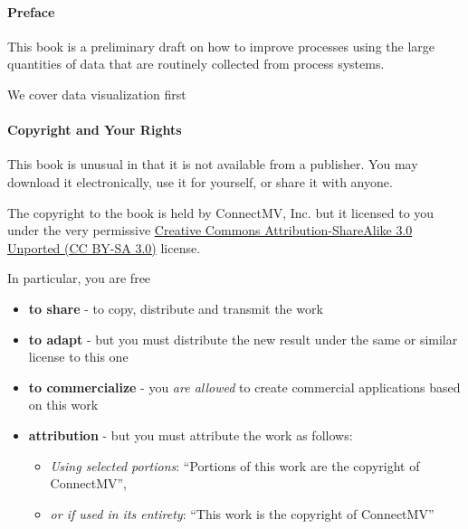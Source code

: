 \paragraph{Preface}





This book is a preliminary draft on how to improve processes using the large quantities of data that are routinely collected from process systems.

We cover data visualization first

\vskip24pt

\paragraph{Copyright and Your Rights}

This book is unusual in that it is not available from a publisher. You may download it electronically, use it for yourself, or share it with anyone.

The copyright to the book is held by ConnectMV, Inc. but it licensed to you under the very permissive \href{http://creativecommons.org/licenses/by-sa/3.0/}{Creative Commons Attribution-ShareAlike 3.0 Unported (CC BY-SA 3.0)} license.

In particular, you are free 
\begin{itemize}
	\item	\textbf{to share} - to copy, distribute and transmit the work
	\item	\textbf{to adapt} - but you must distribute the new result under the same or similar license to this one
	\item	\textbf{to commercialize} - you \emph{are allowed} to create commercial applications based on this work 
	\item	\textbf{attribution} - but you must attribute the work as follows:
	\begin{itemize}
		\item	\emph{Using selected portions}: ``Portions of this work are the copyright of ConnectMV'', 
		\item	\emph{or if used in its entirety}: ``This work is the copyright of ConnectMV''
	\end{itemize}
\end{itemize}

